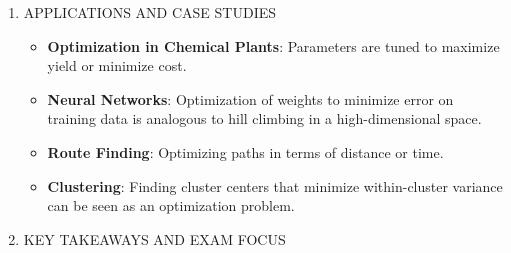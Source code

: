 \documentclass[
  12pt,
]{report}
\providecommand{\tightlist}{%
  \setlength{\itemsep}{0pt}\setlength{\parskip}{0pt}}
\begin{document}
\begin{enumerate}
  B. Algorithms and Methods

  \begin{itemize}
  \tightlist
  \item
    \textbf{Hill Climbing}:

    \begin{enumerate}
    \def\labelenumii{\arabic{enumii}.}
    \tightlist
    \item
      Start with an initial solution.
    \item
      Evaluate neighbors and move to the neighbor with the highest improvement.
    \item
      Repeat until no improvement can be made (local optimum).
    \end{enumerate}
  \item
    \textbf{Simulated Annealing}:

    \begin{enumerate}
    \def\labelenumii{\arabic{enumii}.}
    \tightlist
    \item
      Start with an initial solution and temperature \(T\).
    \item
      Randomly select a neighbor solution \(x_t\).
    \item
      Move to \(x_t\) with probability \(p(x, x_t, T) = \exp\left(\frac{F(x_t) - F(x)}{T}\right)\) if \(F(x_t) < F(x)\).
    \item
      Decrease \(T\) gradually and repeat until convergence.
    \end{enumerate}
  \item
    \textbf{Genetic Algorithms}:

    \begin{enumerate}
    \def\labelenumii{\arabic{enumii}.}
    \tightlist
    \item
      Initialize a population of solutions.
    \item
      Evaluate fitness and select the most fit individuals.
    \item
      Perform crossover and mutation to create a new population.
    \item
      Repeat until convergence.
    \end{enumerate}
  \end{itemize}
\item
  APPLICATIONS AND CASE STUDIES

  \begin{itemize}
  \tightlist
  \item
    \textbf{Optimization in Chemical Plants}: Parameters are tuned to maximize yield or minimize cost.
  \item
    \textbf{Neural Networks}: Optimization of weights to minimize error on training data is analogous to hill climbing in a high-dimensional space.
  \item
    \textbf{Route Finding}: Optimizing paths in terms of distance or time.
  \item
    \textbf{Clustering}: Finding cluster centers that minimize within-cluster variance can be seen as an optimization problem.
  \end{itemize}
\item
  KEY TAKEAWAYS AND EXAM FOCUS


\end{enumerate}
\end{document}
